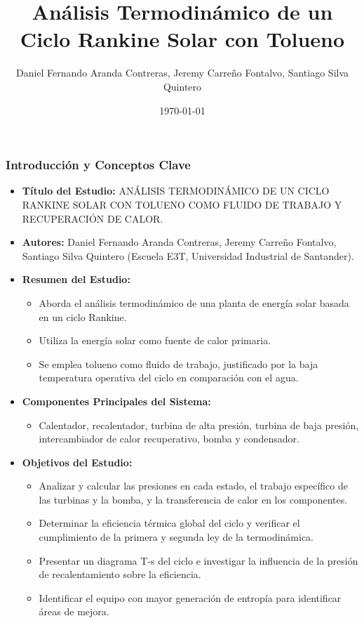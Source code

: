 \documentclass{beamer}
\title{Análisis Termodinámico de un Ciclo Rankine Solar con Tolueno}
\author{Daniel Fernando Aranda Contreras, Jeremy Carreño Fontalvo, Santiago Silva Quintero}
\institute{Escuela E3T, Universidad Industrial de Santander}
\date{\today}
\begin{document}
\frame{\titlepage}

\begin{frame}
    \frametitle{Introducción y Conceptos Clave}
    \begin{itemize}
        \item \textbf{Título del Estudio:} ANÁLISIS TERMODINÁMICO DE UN CICLO RANKINE SOLAR CON TOLUENO COMO FLUIDO DE TRABAJO Y RECUPERACIÓN DE CALOR.
        \item \textbf{Autores:} Daniel Fernando Aranda Contreras, Jeremy Carreño Fontalvo, Santiago Silva Quintero (Escuela E3T, Universidad Industrial de Santander).
        \item \textbf{Resumen del Estudio:}
        \begin{itemize}
            \item Aborda el análisis termodinámico de una planta de energía solar basada en un ciclo Rankine.
            \item Utiliza la energía solar como fuente de calor primaria.
            \item Se emplea tolueno como fluido de trabajo, justificado por la baja temperatura operativa del ciclo en comparación con el agua.
        \end{itemize}
        \item \textbf{Componentes Principales del Sistema:}
        \begin{itemize}
            \item Calentador, recalentador, turbina de alta presión, turbina de baja presión, intercambiador de calor recuperativo, bomba y condensador.
        \end{itemize}
        \item \textbf{Objetivos del Estudio:}
        \begin{itemize}
            \item Analizar y calcular las presiones en cada estado, el trabajo específico de las turbinas y la bomba, y la transferencia de calor en los componentes.
            \item Determinar la eficiencia térmica global del ciclo y verificar el cumplimiento de la primera y segunda ley de la termodinámica.
            \item Presentar un diagrama T-s del ciclo e investigar la influencia de la presión de recalentamiento sobre la eficiencia.
            \item Identificar el equipo con mayor generación de entropía para identificar áreas de mejora.
        \end{itemize}
    \end{itemize}
\end{frame}
\end{document}
